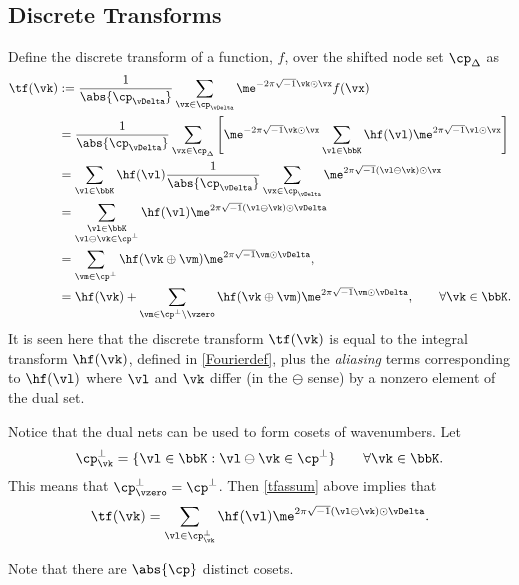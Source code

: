 \documentclass[]{elsarticle}
\theoremstyle{definition}
\theoremstyle{remark}
\begin{document}
\subsection{Discrete Transforms}
Define the discrete transform of a function, $f$, over the shifted node set $\cp_{\Delta}$ as
\begin{align}
\label{tfdef}
\tf(\vk)
&:= \frac{1}{\abs{\cp_{\vDelta}}} \sum_{\vx \in \cp_{\vDelta}} \me^{-2 \pi \sqrt{-1} \vk \odot \vx} f(\vx) \\
\nonumber
&= \frac{1}{\abs{\cp_{\vDelta}}} \sum_{\vx \in \cp_{\Delta}} \left[\me^{-2 \pi \sqrt{-1} \vk \odot \vx}\sum_{\vl \in \bbK} \hf(\vl) \me^{2 \pi \sqrt{-1} \vl \odot \vx} \right] \\
\nonumber
& = \sum_{\vl \in \bbK} \hf(\vl)  \frac{1}{\abs{\cp_{\vDelta}}} \sum_{\vx \in \cp_{\vDelta}}  \me^{2 \pi \sqrt{-1} (\vl \ominus \vk) \odot \vx} \\
\nonumber
& = \sum_{\substack{\vl \in \bbK \\ \vl \ominus \vk \in \cp^{\perp}}} \hf(\vl) \me^{2 \pi \sqrt{-1} (\vl \ominus \vk) \odot \vDelta} \\
\nonumber
&= \sum_{\vm \in \cp^{\perp}} \hf(\vk\oplus\vm) \me^{2 \pi \sqrt{-1} \vm \odot \vDelta}, \\
&= \hf(\vk) + \sum_{\vm \in \cp^{\perp}\setminus \vzero} \hf(\vk\oplus\vm) \me^{2 \pi \sqrt{-1} \vm \odot \vDelta}, \qquad \forall \vk \in \bbK. \label{tfassum}
\end{align}
It is seen here that the discrete transform $\tf(\vk)$ is equal to the integral transform $\hf(\vk)$, defined in \eqref{Fourierdef}, plus the \emph{aliasing} terms corresponding to $\hf(\vl)$ where $\vl$ and $\vk$ differ (in the $\ominus$ sense) by a nonzero element of the dual set.

Notice that the dual nets can be used to form cosets of wavenumbers.  Let
\begin{equation*}
\cp^{\perp}_{\vk} = \{ \vl \in \bbK : \vl \ominus \vk \in \cp^{\perp}\} \qquad \forall \vk \in \bbK.
\end{equation*}
This means that $\cp^{\perp}_{\vzero}=\cp^{\perp}$.  Then \eqref{tfassum} above implies that
\begin{equation}
\label{tfassumb}
\tf(\vk) = \sum_{\vl \in \cp^{\perp}_{\vk}} \hf(\vl) \me^{2 \pi \sqrt{-1} (\vl \ominus \vk) \odot \vDelta}.
\end{equation}

Note that there are $\abs{\cp}$ distinct cosets.
\end{document}
